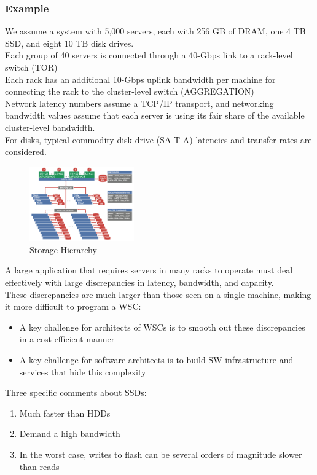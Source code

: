 \documentclass[10pt, oneside]{article}
\begin{document}
\subsubsection*{Example}
\begin{multicols}{2}
We assume a system with 5,000 servers, each with 256 GB of DRAM, one 4 TB SSD, and eight 10 TB disk drives.\\
Each group of 40 servers is connected through a 40-Gbps link to a rack-level switch (TOR)\\
Each rack has an additional 10-Gbps uplink bandwidth per machine for connecting the rack to the cluster-level switch (AGGREGATION)\\
Network latency numbers assume a TCP/IP transport, and networking bandwidth values assume that each server is using its fair share of the available cluster-level bandwidth.\\
For disks, typical commodity disk drive (SA T A) latencies and transfer rates are considered.
\columnbreak
\begin{figure}[H]
    \begin{center}
    \includegraphics[width=0.4\textwidth]{img/img25.png}
    \caption{Storage Hierarchy}
    \label{fig:Storage Hierarchy}
    \end{center}
\end{figure}
\end{multicols}
A large application that requires servers in many racks to operate must deal effectively with large discrepancies in latency, bandwidth, and capacity.\\
\newline
These discrepancies are much larger than those seen on a single machine, making it more difficult to program a WSC:
\begin{itemize}
    \item A key challenge for architects of WSCs is to smooth out these discrepancies in a cost-efficient manner
    \item A key challenge for software architects is to build SW infrastructure and services that hide this complexity
\end{itemize} Three specific comments about SSDs:
\begin{enumerate}
    \item Much faster than HDDs
    \item Demand a high bandwidth
    \item In the worst case, writes to flash can be several orders of magnitude slower than reads
\end{enumerate}

\newpage
\end{document}
